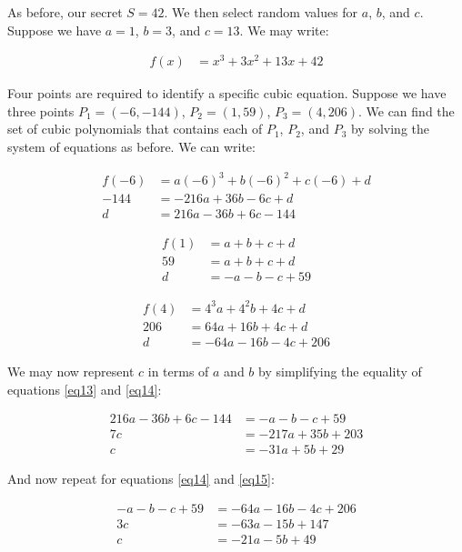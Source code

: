 \documentclass[preview,border=3mm]{article}
\begin{document}
\noindent
As before, our secret $S = 42$. We then select random values for $a$, $b$, and
$c$. Suppose we have $a = 1$, $b = 3$, and $c = 13$. We may write:

\begin{align}
    f(x) &= x^3 + 3x^2 + 13x + 42 \label{eq12}
\end{align}

\noindent
Four points are required to identify a specific cubic equation. Suppose we have
three points $P_1 = (-6, -144)$, $P_2 = (1, 59)$, $P_3 = (4, 206)$. We can find
the set of cubic polynomials that contains each of $P_1$, $P_2$, and $P_3$ by
solving the system of equations as before. We can write:

\begin{align}
    f(-6) &= a(-6)^3 + b(-6)^2 + c(-6) + d \nonumber \\
    -144  &= -216a + 36b - 6c + d \nonumber \\
    d     &= 216a - 36b + 6c - 144 \label{eq13}
\end{align}

\begin{align}
    f(1) &= a + b + c + d \nonumber \\
    59   &= a + b + c + d \nonumber \\
    d    &= -a - b - c + 59\label{eq14}
\end{align}

\begin{align}
    f(4) &= 4^3a + 4^2b + 4c + d \nonumber \\
    206  &= 64a + 16b + 4c + d \nonumber \\
    d    &= -64a - 16b - 4c + 206 \label{eq15}
\end{align}

\noindent
We may now represent $c$ in terms of $a$ and $b$ by simplifying the equality
of equations \ref{eq13} and \ref{eq14}:

\begin{align}
    216a - 36b + 6c - 144 &= -a -b -c + 59 \nonumber \\
    7c &= -217a + 35b + 203 \nonumber \\
    c &= -31a + 5b + 29 \label{eq16}
\end{align}

\noindent
And now repeat for equations \ref{eq14} and \ref{eq15}:

\begin{align}
    -a - b - c + 59 &= -64a - 16b - 4c + 206 \nonumber \\
    3c &= -63a - 15b + 147 \nonumber \\
    c &= -21a - 5b + 49 \label{eq17}
\end{align}
\end{document}
